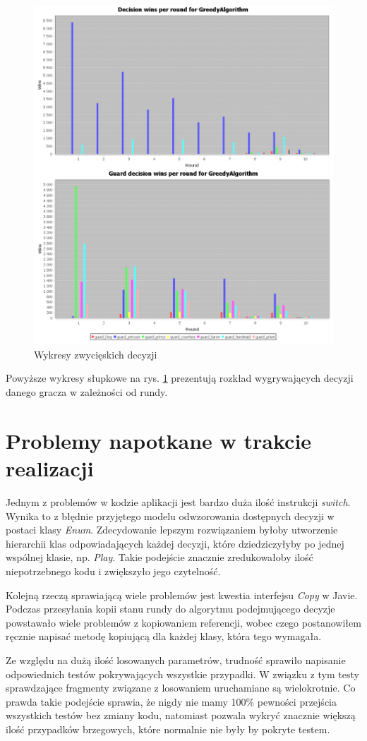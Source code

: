 \begin{figure}[H]
	\centering
	\includegraphics[width=\textwidth]{Resources/decisionWinsPerRoundChart.PNG}
	\caption{Wykresy zwycięskich decyzji} 
	\label{fig:decisionChart}
\end{figure}

Powyższe wykresy słupkowe na rys. \ref{fig:decisionChart} prezentują rozkład wygrywających decyzji danego gracza w zależności od rundy.

\clearpage
\section{Problemy napotkane w trakcie realizacji}
Jednym z problemów w kodzie aplikacji jest bardzo duża ilość instrukcji \textit{switch}. Wynika to z błędnie przyjętego modelu odwzorowania dostępnych decyzji w postaci klasy \textit{Enum}. Zdecydowanie lepszym rozwiązaniem byłoby utworzenie hierarchii klas odpowiadających każdej decyzji, które dziedziczyłyby po jednej wspólnej klasie, np. \textit{Play}. Takie podejście znacznie zredukowałoby ilość niepotrzebnego kodu i zwiększyło jego czytelność.

Kolejną rzeczą sprawiającą wiele problemów jest kwestia interfejsu \textit{Copy} w Javie. Podczas przesyłania kopii stanu rundy do algorytmu podejmującego decyzje powstawało wiele problemów z kopiowaniem referencji, wobec czego postanowiłem ręcznie napisać metodę kopiującą dla każdej klasy, która tego wymagała.

Ze względu na dużą ilość losowanych parametrów, trudność sprawiło napisanie odpowiednich testów pokrywających wszystkie przypadki. W związku z tym testy sprawdzające fragmenty związane z losowaniem uruchamiane są wielokrotnie. Co prawda takie podejście sprawia, że nigdy nie mamy 100\% pewności przejścia wszystkich testów bez zmiany kodu, natomiast pozwala wykryć znacznie większą ilość przypadków brzegowych, które normalnie nie były by pokryte testem.